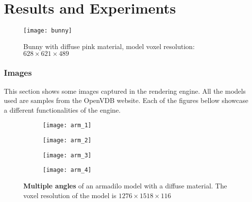 
\part{Results and Experiments}

\begin{figure}[H]
  \centering
  \texttt{[image: bunny]}
  \caption{Bunny with diffuse pink material, model voxel resolution: $628\times621\times489$}
\end{figure}

\section{Images}

This section shows some images captured in the rendering engine. All the models used are samples from the OpenVDB website\supercite{openvdb:models}. Each of the figures bellow showcase a different functionalities of the engine.

\begin{figure}[H]
  \centering
  \begin{subfigure}[b]{0.48\textwidth}
    \texttt{[image: arm\_1]}
  \end{subfigure}
  \hfill
  \begin{subfigure}[b]{0.48\textwidth}
    \texttt{[image: arm\_2]}
  \end{subfigure}
  \begin{subfigure}[b]{0.48\textwidth}
    \texttt{[image: arm\_3]}
  \end{subfigure}
  \hfill
  \begin{subfigure}[b]{0.48\textwidth}
    \texttt{[image: arm\_4]}
  \end{subfigure}
  \caption{\textbf{Multiple angles} of an armadilo model with a diffuse material. The voxel resolution of the model is $1276\times1518\times116$}
\end{figure}

